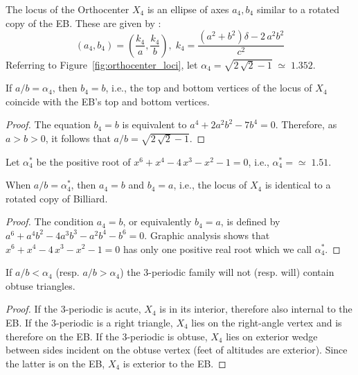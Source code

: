 The locus of the Orthocenter $X_4$ is an ellipse of axes $a_4,b_4$ similar to a rotated copy of the EB. These are given by \cite {garcia2020-ellipses}:
%
\begin{equation*}
\left(a_4,b_4\right)=\left(\frac{k_4}{a},\frac{k_4}{b}\right),\;  k_4=\frac{  ({a}^{2}+{b}^{2})\delta-2\,{a}^{2}{b}^{2} }{c^2}    
\end{equation*}
%
\noindent Referring to Figure~\ref{fig:orthocenter_loci}, let $\alpha_4=\sqrt{2\,\sqrt {2}-1}\;{\simeq}\;1.352$.

\begin{proposition}
If $a/b=\alpha_4$, then $b_4=b$, i.e., the top and bottom vertices of the locus of $X_4$ coincide with the EB's top and bottom vertices.
\end{proposition}

\begin{proof}
The equation $b_4=b$ is equivalent to $a^4+2a^2b^2-7b^4=0.$ Therefore, as $a>b>0$, it follows that $a/b=\sqrt{2\,\sqrt {2}-1}.$
\end{proof}

\noindent Let $\alpha_4^*$ be the positive root of
${x}^{6}+{x}^{4}-4\,{x}^{3}-{x}^{2}-1=0$, i.e.,
$\alpha_4^{*}={\simeq}\;1.51$. 

\begin{proposition}
When $a/b=\alpha_4^{*}$, then $a_4=b$ and $b_4=a$, i.e., the locus of $X_4$ is identical to a rotated copy of Billiard. 
\end{proposition}

\begin{proof}
The condition $a_4=b$, or equivalently $b_4=a$, is defined by $a^6+a^4b^2-4a^3b^3-a^2b^4-b^6=0$. Graphic analysis shows that ${x}^{6}+{x}^{4}-4\,{x}^{3}-{x}^{2}-1=0$ has only one positive real root which we call $\alpha_4^*$.
\end{proof}

\begin{theorem}
If $a/b<\alpha_4$ (resp. $a/b>\alpha_4$) the 3-periodic family will not (resp. will) contain obtuse triangles.
\end{theorem}

\begin{proof}
If the 3-periodic is acute, $X_4$ is in its interior, therefore also internal to the EB. If the 3-periodic is a right triangle, $X_4$ lies on the right-angle vertex and is therefore on the EB. If the 3-periodic is obtuse, $X_4$ lies on exterior wedge between sides incident on the obtuse vertex (feet of altitudes are exterior). Since the latter is on the EB, $X_4$ is exterior to the EB.
\end{proof}

